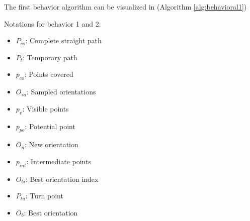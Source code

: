 \vspace*{6mm}  


The first behavior algorithm can be visualized in (Algorithm \autoref{alg:behavioral1})

Notations for behavior 1 and 2:
\begin{multicols}{2}
    \begin{itemize}[noitemsep,topsep=0pt]
        \item $P_{cs}$: Complete straight path
        \item $P_{t}$: Temporary path
        \item $p_{co}$: Points covered
        \item $O_{sa}$: Sampled orientations
        \item $p_v$: Visible points
        \item $p_{po}$: Potential point
        \item $O_n$: New orientation
        \item $p_{int}$: Intermediate points
        \item $O_{bi}$: Best orientation index
        \item $P_{tu}$: Turn point
        \item $O_b$: Best orientation
    \end{itemize}
\end{multicols}

